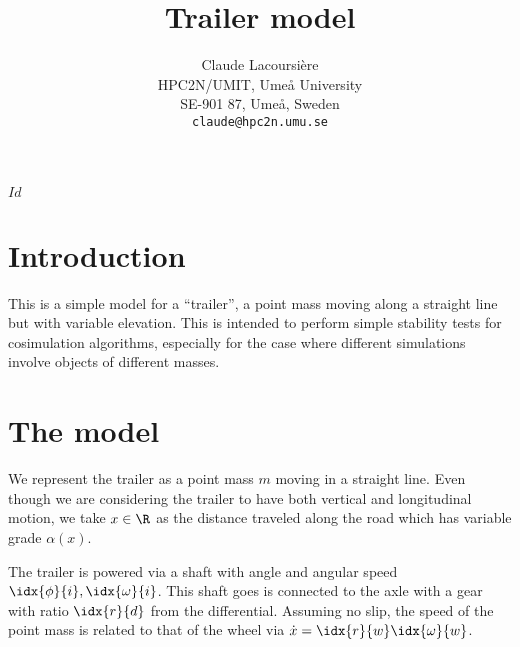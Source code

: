 \documentclass[10pt,notitlepage,abstracton]{scrartcl}
\title{Trailer model}
\author{Claude Lacoursi{\`{e}}re \\
  HPC2N/UMIT, Ume{\aa} University\\
  SE-901 87, Ume{\aa}, Sweden\\
  \texttt{claude@hpc2n.umu.se}
}
\theoremstyle{plain}
\theoremstyle{plain}
\theoremstyle{plain}
\begin{document}
\svnInfo $Id$
\maketitle{}
\svnId
\begin{abstract}

\end{abstract}

\section{Introduction}
\label{sec:introduction}

This is a simple model for a ``trailer'', a point mass moving along a
straight line but with variable elevation.   This is intended to perform
simple stability tests for cosimulation algorithms, especially for the case
where different simulations involve objects of different masses. 

\section{The model}
\label{sec:model}

We represent the trailer as a point mass $m$ moving in a straight line. Even
though we are considering the trailer to have both vertical and
longitudinal motion, we take $x\in\R$ as the distance traveled along the road
which has variable grade $\alpha(x)$.  


The trailer is powered via a shaft with angle and angular speed
$\idx{\phi}{i},\idx{\omega}{i}$.  This shaft goes is connected to the axle
with a gear with ratio $\idx{r}{d}$ from the differential.  Assuming no
slip, the speed of the point mass is related to that of the wheel via
$\dot{x} = \idx{r}{w}\idx{\omega}{w}$.
\end{document}
